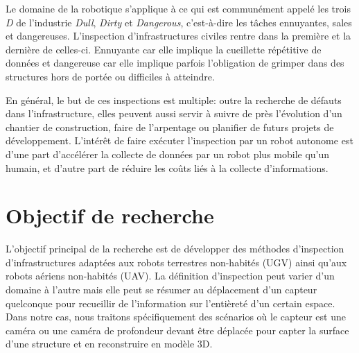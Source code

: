 \label{sec:Introduction}  %
Le domaine de la robotique s'applique à ce qui est communément appelé les trois \emph{D} de l'industrie \emph{Dull}, \emph{Dirty} et \emph{Dangerous}, c'est-à-dire les tâches ennuyantes, sales et dangereuses. L'inspection d'infrastructures civiles rentre dans la première et la dernière de celles-ci. Ennuyante car elle implique la cueillette répétitive de données et dangereuse car elle implique parfois l'obligation de grimper dans des structures hors de portée ou difficiles à atteindre.

En général, le but de ces inspections est multiple: outre la recherche de défauts dans l'infrastructure, elles peuvent aussi servir à suivre de près l'évolution d'un chantier de construction, faire de l'arpentage ou planifier de futurs projets de développement. L'intérêt de faire exécuter l'inspection par un robot autonome est d'une part d'accélérer la collecte de données par un robot plus mobile qu'un humain, et d'autre part de réduire les coûts liés à la collecte d'informations.



\section{Objectif de recherche}

L'objectif principal de la recherche est de développer des méthodes d'inspection d'infrastructures adaptées aux robots terrestres non-habités (UGV) ainsi qu'aux robots aériens non-habités (UAV). La définition d'inspection peut varier d'un domaine à l'autre mais elle peut se résumer au déplacement d'un capteur quelconque pour recueillir de l'information sur l'entièreté d'un certain espace. Dans notre cas, nous traitons spécifiquement des scénarios où le capteur est une caméra ou une caméra de profondeur devant être déplacée pour capter la surface d'une structure et en reconstruire en modèle 3D.

